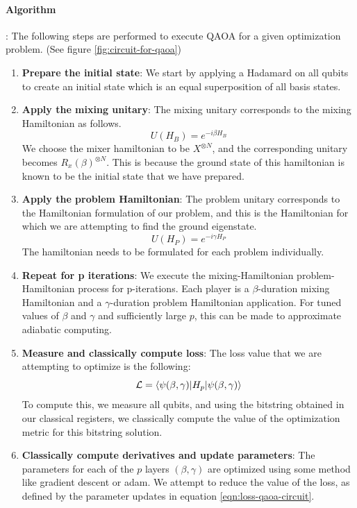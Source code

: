 \paragraph*{Algorithm}: The following steps are performed to execute QAOA for a given optimization problem. (See figure \ref{fig:circuit-for-qaoa})
\begin{enumerate}
    \item \textbf{Prepare the initial state}: We start by applying a Hadamard on all qubits to create an initial state which is an equal superposition of all basis states.
    \item \textbf{Apply the mixing unitary}: The mixing unitary corresponds to the mixing Hamiltonian as follows.
    \begin{equation}
        U(H_B) = e^{-i \beta H_B}
    \end{equation}
    We choose the mixer hamiltonian to be $X^{\otimes N}$, and the corresponding unitary becomes $R_x(\beta)^{\otimes N}$. This is because the ground state of this hamiltonian is known to be the initial state that we have prepared.
    \item \textbf{Apply the problem Hamiltonian}: The problem unitary corresponds to the Hamiltonian formulation of our problem, and this is the Hamiltonian for which we are attempting to find the ground eigenstate.
    \begin{equation}
        U(H_P) = e^{-i \gamma H_P}
    \end{equation}
    The hamiltonian needs to be formulated for each problem individually.
    \item \textbf{Repeat for p iterations}: We execute the mixing-Hamiltonian problem-Hamiltonian process for p-iterations. Each player is a $\beta$-duration mixing Hamiltonian and a $\gamma$-duration problem Hamiltonian application. For tuned values of $\beta$ and $\gamma$ and sufficiently large $p$, this can be made to approximate adiabatic computing.
    \item \textbf{Measure and classically compute loss}: The loss value that we are attempting to optimize is the following:
    \begin{equation}\label{eqn:loss-qaoa-circuit}
        \mathcal{L} = \braket{\psi(\beta, \gamma) \vert H_p \vert \psi(\beta, \gamma)}
    \end{equation}
    To compute this, we measure all qubits, and using the bitstring obtained in our classical registers, we classically compute the value of the optimization metric for this bitstring solution.
    \item \textbf{Classically compute derivatives and update parameters}: The parameters for each of the $p$ layers $(\beta, \gamma)$ are optimized using some method like gradient descent or adam. We attempt to reduce the value of the loss, as defined by the parameter updates in equation \ref{eqn:loss-qaoa-circuit}.
\end{enumerate}

